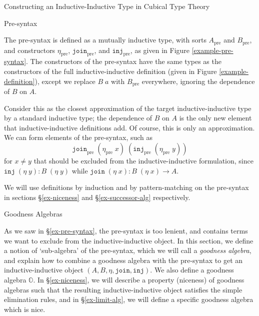 \documentclass[runningheads]{llncs}
\newcommand{\erase}[1]{{}}
\newcommand{\pre}[1]{{#1}_\text{pre}}
\newcommand{\bbO}{\mathbb{O}}
\newcommand{\join}{\texttt{join}}
\newcommand{\inj}{\texttt{inj}}
\begin{document}
\begin{section}{Constructing an Inductive-Inductive Type in Cubical Type Theory}
\erase{We will follow the same sequence of steps in \S\ref{construct-cubical}, where we perform the construction for arbitrary inductive-inductive definitions.}

\begin{subsection}{Pre-syntax}\label{ex-pre-syntax}

The pre-syntax is defined as a mutually inductive type, with sorts $\pre{A}$ and $\pre{B}$, and constructors $\pre{\eta}$, $\pre{\join}$, and $\pre{\inj}$, as given in Figure \ref{example-pre-syntax}. The constructors of the pre-syntax have the same types as the constructors of the full inductive-inductive definition (given in Figure \ref{example-definition}), except we replace $B\;a$ with $\pre{B}$ everywhere, ignoring the dependence of $B$ on $A$.

Consider this as the closest approximation of the target inductive-inductive type by a standard inductive type; the dependence of $B$ on $A$ is the only new element that inductive-inductive definitions add. Of course, this is only an approximation. We can form elements of the pre-syntax, such as \[\pre{\join}\;(\pre{\eta}\;x)\;(\pre{\inj}\;(\pre{\eta}\;y))\] for $x \neq y$ that should be excluded from the inductive-inductive formulation, since $\inj\;(\eta\;y) : B\;(\eta\;y)$ while $\join\;(\eta\;x) : B\;(\eta\;x) \to A$.

We will use definitions by induction and by pattern-matching on the pre-syntax in sections \S\ref{ex-niceness} and \S\ref{ex-successor-alg} respectively.

\end{subsection}

\begin{subsection}{Goodness Algebras}\label{ex-goodness-algebra}

As we saw in \S\ref{ex-pre-syntax}, the pre-syntax is too lenient, and contains terms we want to exclude from the inductive-inductive object. In this section, we define a notion of `sub-algebra' of the pre-syntax, which we will call a \emph{goodness algebra}, and explain how to combine a goodness algebra with the pre-syntax to get an inductive-inductive object $(A, B, \eta, \join, \inj)$. We also define a goodness algebra $\bbO$. In \S\ref{ex-niceness}, we will describe a property (niceness) of goodness algebras such that the resulting inductive-inductive object satisfies the simple elimination rules, and in \S\ref{ex-limit-alg}, we will define a specific goodness algebra which is nice.

\begin{figure}[htb]\begin{flushleft}


\end{flushleft}
\end{figure}
\end{subsection}
\end{section}
\end{document}
